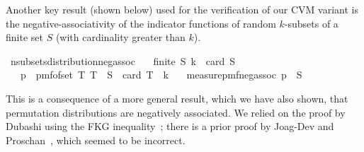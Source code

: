 Another key result (shown below) used for the verification of our CVM variant is the negative-associativity of the indicator functions of random $k$-subsets of a finite set $S$ (with cardinality greater than $k$).
\begin{isabelle_cm}
\isamarkupfalse%
\ n{\isacharunderscore}{\kern0pt}subsets{\isacharunderscore}{\kern0pt}distribution{\isacharunderscore}{\kern0pt}neg{\isacharunderscore}{\kern0pt}assoc{\isacharcolon}{\kern0pt}\isanewline
\ \ \ {\isacartoucheopen}finite\ S{\isacartoucheclose}\ {\isacartoucheopen}k\ {\isasymle}\ card\ S{\isacartoucheclose}\isanewline
\ \ \ {\isacartoucheopen}p\ {\isasymequiv}\ pmf{\isacharunderscore}{\kern0pt}of{\isacharunderscore}{\kern0pt}set\ {\isacharbraceleft}{\kern0pt}T{\isachardot}{\kern0pt}\ T\ {\isasymsubseteq}\ S\ {\isasymand}\ card\ T\ {\isacharequal}{\kern0pt}\ k{\isacharbraceright}{\kern0pt}{\isacartoucheclose}\isanewline
\ \ \ {\isacartoucheopen}measure{\isacharunderscore}{\kern0pt}pmf{\isachardot}{\kern0pt}neg{\isacharunderscore}{\kern0pt}assoc\ p\ {\isacharparenleft}{\kern0pt}{\isasymin}{\isacharparenright}{\kern0pt}\ S{\isacartoucheclose}
\end{isabelle_cm}
This is a consequence of a more general result, which we have also shown, that permutation distributions are negatively associated.
We relied on the proof by Dubashi using the FKG inequality~\cite[Th. 10]{dubhashi1996}; there is a prior proof by Joag-Dev and Proschan~\cite[Th. 2.11]{joagdev1983}, which seemed to be incorrect.
